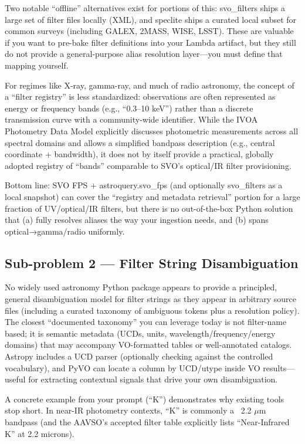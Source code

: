 \documentclass[twocolumn]{aastex701}
\begin{document}
Two notable “offline” alternatives exist for portions of this: svo\_filters ships a large set of filter files locally (XML), and speclite ships a curated local subset for common surveys (including GALEX, 2MASS, WISE, LSST). These are valuable if you want to pre-bake filter definitions into your Lambda artifact, but they still do not provide a general-purpose alias resolution layer—you must define that mapping yourself. \citep{ref17}

For regimes like X-ray, gamma-ray, and much of radio astronomy, the concept of a “filter registry” is less standardized: observations are often represented as energy or frequency bands (e.g., “0.3–10 keV”) rather than a discrete transmission curve with a community-wide identifier. While the IVOA Photometry Data Model explicitly discusses photometric measurements across all spectral domains and allows a simplified bandpass description (e.g., central coordinate + bandwidth), it does not by itself provide a practical, globally adopted registry of “bands” comparable to SVO’s optical/IR filter provisioning. \citep{ref18}

Bottom line: SVO FPS + astroquery.svo\_fps (and optionally svo\_filters as a local snapshot) can cover the “registry and metadata retrieval” portion for a large fraction of UV/optical/IR filters, but there is no out-of-the-box Python solution that (a) fully resolves aliases the way your ingestion needs, and (b) spans optical→gamma/radio uniformly. \citep{ref19}

\subsection{Sub-problem 2 — Filter String Disambiguation}

No widely used astronomy Python package appears to provide a principled, general disambiguation model for filter strings as they appear in arbitrary source files (including a curated taxonomy of ambiguous tokens plus a resolution policy). The closest “documented taxonomy” you can leverage today is not filter-name based; it is semantic metadata (UCDs, units, wavelength/frequency/energy domains) that may accompany VO-formatted tables or well-annotated catalogs. Astropy includes a UCD parser (optionally checking against the controlled vocabulary), and PyVO can locate a column by UCD/utype inside VO results—useful for extracting contextual signals that drive your own disambiguation. \citep{ref20}

A concrete example from your prompt (“K”) demonstrates why existing tools stop short. In near-IR photometry contexts, “K” is commonly a ~2.2 $\mu$m bandpass (and the AAVSO’s accepted filter table explicitly lists “Near-Infrared K” at 2.2 microns). \citep{ref21}
\end{document}
